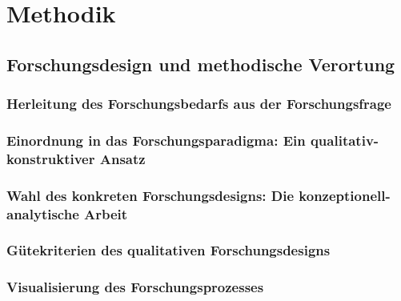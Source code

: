 \chapter{Methodik}
\label{ch:methodik}


\section{Forschungsdesign und methodische Verortung}
\label{sec: 3.1}
\subsection{Herleitung des Forschungsbedarfs aus der Forschungsfrage}
\label{sec: 3.1.1}

%   


\subsection{Einordnung in das Forschungsparadigma: Ein qualitativ-konstruktiver Ansatz}
\label{sec: 3.1.2}

\subsection{Wahl des konkreten Forschungsdesigns: Die konzeptionell-analytische Arbeit}
\label{sec: 3.1.3}

  \subsection{Gütekriterien des qualitativen Forschungsdesigns}
\label{sec: 3.1.4}

\subsection{Visualisierung des Forschungsprozesses}
\label{sec: 3.1.5}

